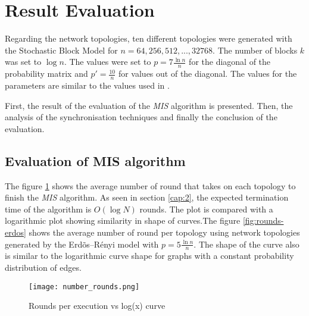 \section{Result Evaluation}
\label{chap:6}
Regarding the network topologies, ten different topologies were generated with the Stochastic Block Model for $n = 64, 256, 512,..., 32768$. The number of blocks $k$ was set to $\log n$. The values were set to $p = 7{\tfrac {\ln n}{n}}$ for the diagonal of the probability matrix and  $p\prime = {\tfrac {10}{n}}$ for values out of the diagonal. The values for the parameters are similar to the values used in \cite{kothapalli2013analysis}.

First, the result of the evaluation of the \textit{MIS} algorithm is presented. Then, the analysis of the synchronisation techniques and finally the conclusion of the evaluation.



\subsection{Evaluation of MIS algorithm}

The figure \ref{fig:rounds_execution} shows the average number of round that takes on each topology to finish the \textit{MIS} algorithm. As seen in section \ref{cap:2}, the expected termination time of the algorithm is $O(\log N)$ rounds. The plot is compared with a logarithmic plot showing similarity in shape of curves.The figure \ref{fig:rounds-erdos} shows the average number of round per topology using network topologies generated by the Erd\~os--R\'enyi model with  $p = 5{\tfrac {\ln n}{n}}$. The shape of the curve also is similar to the logarithmic curve shape for graphs with a constant probability distribution of edges.


\begin{figure}[ht]
\centering
\texttt{[image: number\_rounds.png]} 
\caption{Rounds per execution vs log(x) curve}
\label{fig:rounds_execution}
\end{figure}



